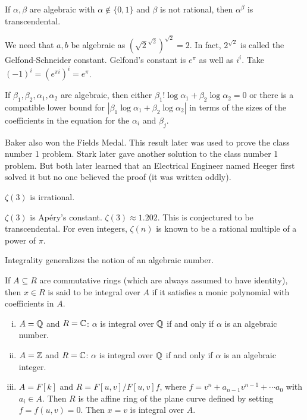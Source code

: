 \begin{thm}
If $\alpha,\beta$ are algebraic with $\alpha \notin \{0,1\}$ and $\beta$ is not rational, then $\alpha^\beta$ is transcendental. 
\end{thm}

\tb We need that $a,b$ be algebraic as $(\sqrt{2}^{\sqrt{2}})^{\sqrt{2}}=2$. In fact, $2^{\sqrt{2}}$ is called the Gelfond-Schneider constant. Gelfond's constant is $e^\pi$ as well as $i^i$. Take $(-1)^i=(e^{\pi i})^i = e^{\pi}$. \\

\begin{thm}[Baker]
If $\beta_1,\beta_2,\alpha_1,\alpha_2$ are algebraic, then either $\beta_1!\log \alpha_1 + \beta_2 \log \alpha_2=0$ or there is a compatible lower bound for $|\beta_1\log\alpha_1+\beta_2\log\alpha_2|$ in terms of the sizes of the coefficients in the equation for the $\alpha_i$ and $\beta_j$. 
\end{thm}

\tb Baker also won the Fields Medal. This result later was used to prove the class number 1 problem. Stark later gave another solution to the class number 1 problem. But both later learned that an Electrical Engineer named Heeger first solved it but no one believed the proof (it was written oddly). 

\begin{thm}[Ap\'ery]
$\zeta(3)$ is irrational. 
\end{thm}

\tb $\zeta(3)$ is Ap\'ery's constant. $\zeta(3) \approx 1.202$. This is conjectured to be transcendental. For even integers, $\zeta(n)$ is known to be a rational multiple of a power of $\pi$. 

\tb Integrality generalizes the notion of an algebraic number.

\begin{dfn}[Integral]
If $A \subseteq R$ are commutative rings (which are always assumed to have identity), then $x \in R$ is said to be integral over $A$ if it satisfies a monic polynomial with coefficients in $A$. 
\end{dfn}

\begin{ex}\hfill
\begin{enumerate}[(i)]
\item $A=\mathbb{Q}$ and $R=\mathbb{C}$: $\alpha$ is integral over $\mathbb{Q}$ if and only if $\alpha$ is an algebraic number.
\item $A=\mathbb{Z}$ and $R=\mathbb{C}$: $\alpha$ is integral over $\mathbb{Q}$ if and only if $\alpha$ is an algebraic integer.
\item $A=F[k]$ and $R=F[u,v]/F[u,v]f$, where $f=v^n+a_{n-1}v^{n-1}+\cdots a_0$ with $a_i \in A$. Then $R$ is the affine ring of the plane curve defined by setting $f=f(u,v)=0$. Then $x=v$ is integral over $A$.
\end{enumerate}
\end{ex}

